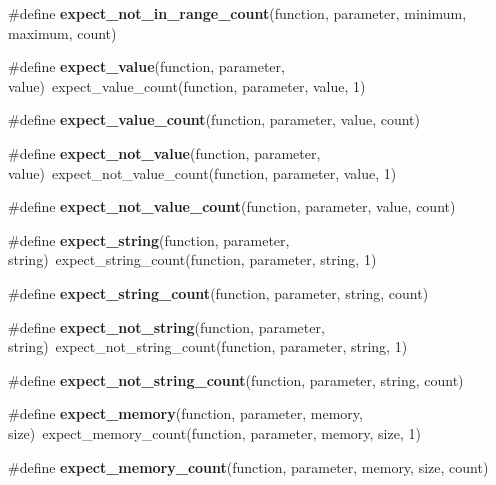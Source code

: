 \begin{DoxyCompactItemize}
\item 
\#define {\bfseries expect\+\_\+not\+\_\+in\+\_\+range\+\_\+count}(function,  parameter,  minimum,  maximum,  count)
\item 
\mbox{\label{group__cmocka__param_ga2154830f7a9be7cfa625ef90fbc9d128}} 
\#define {\bfseries expect\+\_\+value}(function,  parameter,  value)~expect\+\_\+value\+\_\+count(function, parameter, value, 1)
\item 
\#define {\bfseries expect\+\_\+value\+\_\+count}(function,  parameter,  value,  count)
\item 
\mbox{\label{group__cmocka__param_ga4aeffd343fefec1d3ddc27d26dcf5490}} 
\#define {\bfseries expect\+\_\+not\+\_\+value}(function,  parameter,  value)~expect\+\_\+not\+\_\+value\+\_\+count(function, parameter, value, 1)
\item 
\#define {\bfseries expect\+\_\+not\+\_\+value\+\_\+count}(function,  parameter,  value,  count)
\item 
\mbox{\label{group__cmocka__param_ga892af0d501f603e14e3d26b3f09fd8aa}} 
\#define {\bfseries expect\+\_\+string}(function,  parameter,  string)~expect\+\_\+string\+\_\+count(function, parameter, string, 1)
\item 
\#define {\bfseries expect\+\_\+string\+\_\+count}(function,  parameter,  string,  count)
\item 
\mbox{\label{group__cmocka__param_ga2c2f33e4b6cc665e73b755f0ce8ac851}} 
\#define {\bfseries expect\+\_\+not\+\_\+string}(function,  parameter,  string)~expect\+\_\+not\+\_\+string\+\_\+count(function, parameter, string, 1)
\item 
\#define {\bfseries expect\+\_\+not\+\_\+string\+\_\+count}(function,  parameter,  string,  count)
\item 
\mbox{\label{group__cmocka__param_gac7238d7575129c6834eea33e94f48cbf}} 
\#define {\bfseries expect\+\_\+memory}(function,  parameter,  memory,  size)~expect\+\_\+memory\+\_\+count(function, parameter, memory, size, 1)
\item 
\#define {\bfseries expect\+\_\+memory\+\_\+count}(function,  parameter,  memory,  size,  count)
\item 
\mbox{\label{group__cmocka__param_gaf0df5d9ce099eb1adaa083d6b312e0a8}} 

\end{DoxyCompactItemize}
